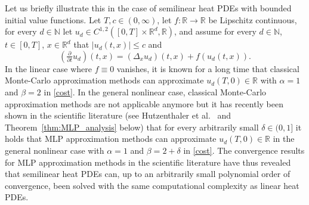 \documentclass[12pt]{article}
\theoremstyle{definition}
\newcommand{\R}{\mathbb{R}}
\newcommand{\N}{\mathbb{N}}
\begin{document}
Let us briefly illustrate this in the case of semilinear heat PDEs 
with bounded initial value functions. 
Let $ T, c \in (0,\infty) $, 
let $ f \colon \R \to \R $ be Lipschitz continuous, 
for every $ d \in \N $ let 
$ u_d \in C^{ 1, 2 }( [0,T] \times \R^d, \R ) $, 
and assume for every 
$ d \in \N $, $ t \in [0,T] $,
$ x \in \R^d $
that 
$
  | u_d(t,x) | \leq c
$
and 
\begin{equation}
\label{eq:MLP_allen_cahn_pde_intro}
  (\tfrac{\partial}{\partial t}u_d)(t,x) 
  = 
  (\Delta_x u_d)(t,x) 
  + 
  f(u_d(t,x)) .
\end{equation} 
In the linear case where $ f \equiv 0 $ vanishes, 
it is known for a long time that 
classical Monte-Carlo approximation methods 
can approximate $ u_d( T, 0 ) \in \R $ 
with $ \alpha = 1 $ and $ \beta = 2 $ 
in \eqref{cost}. 
In the general nonlinear case, 
classical Monte-Carlo approximation methods 
are not applicable anymore 
but 
it has recently been shown in the scientific literature 
(see 
Hutzenthaler et al.~\cite{Hutzenthaleretal2018arXiv} 
and Theorem~\ref{thm:MLP_analysis} below) 
that 
for every arbitrarily small $ \delta \in (0,1] $ 
it holds that 
MLP approximation methods 
can approximate $ u_d( T, 0 ) \in \R $ 
in the general nonlinear case 
with $ \alpha = 1 $ and $ \beta = 2 + \delta $ 
in \eqref{cost}. 
The convergence results for MLP approximation methods 
in the scientific literature have thus revealed that 
semilinear heat PDEs can, up to an arbitrarily small 
polynomial order of convergence, been solved 
with the same computational complexity 
as linear heat PDEs. 
\end{document}
